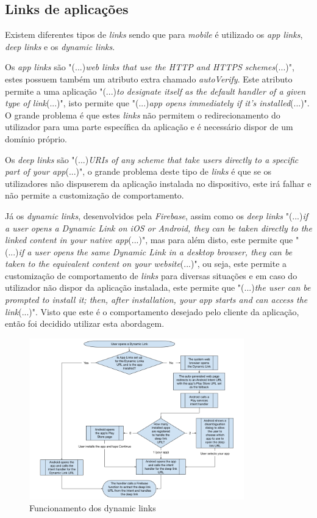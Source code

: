 \subsection{Links de aplicações}

Existem diferentes tipos de \textit{links} sendo que para \textit{mobile} é utilizado os \textit{app links}, \textit{deep links} e os \textit{dynamic links}.

Os \emph{app links} são "(...)\emph{web links that use the HTTP and HTTPS schemes}(...)"\citep{linking}, estes possuem também um atributo extra chamado \textit{autoVerify}. Este atributo permite a uma aplicação "(...)\emph{to designate itself as the default handler of a given type of link}(...)"\citep{linking}, isto permite que "(...)\emph{app opens immediately if it's installed}(...)"\citep{linking}. O grande problema é que estes \textit{links} não permitem o redirecionamento do utilizador para uma parte específica da aplicação e é necessário dispor de um domínio próprio.


Os \textit{deep links} são "(...)\emph{URIs of any scheme that take users directly to a specific part of your app}(...)"\citep{linking}, o grande problema deste tipo de \textit{links} é que se os utilizadores não dispuserem da aplicação instalada no dispositivo, este irá falhar e não permite a customização de comportamento.

Já os \textit{dynamic links}, desenvolvidos pela \textit{Firebase}, assim como os \textit{deep links} "(...)\emph{if a user opens a Dynamic Link on iOS or Android, they can be taken directly to the linked content in your native app}(...)"\citep{dynamic_linking}, mas para além disto, este permite que "(...)\emph{if a user opens the same Dynamic Link in a desktop browser, they can be taken to the equivalent content on your website}(...)"\citep{dynamic_linking}, ou seja, este permite a customização de comportamento de \textit{links} para diversas situações e em caso do utilizador não dispor da aplicação instalada, este permite que "(...)\emph{the user can be prompted to install it; then, after installation, your app starts and can access the link}(...)"\citep{dynamic_linking}. Visto que este é o comportamento desejado pelo cliente da aplicação, então foi decidido utilizar esta abordagem.

\begin{figure}[htb]
  \centering
  \includegraphics[width=0.83\textwidth]{images/diagramas/fdl-android-integration.png}
  \caption{Funcionamento dos dynamic links \citep{linking_firebase}}
  \label{fig:23}
\end{figure}
